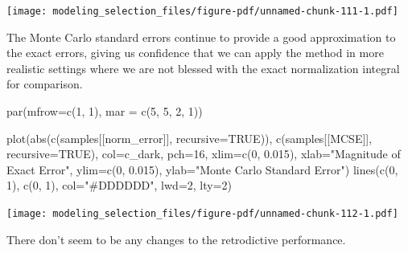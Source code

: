 \documentclass[
  letterpaper,
  DIV=11,
  numbers=noendperiod]{scrartcl}
\newenvironment{Shaded}{\begin{snugshade}}{\end{snugshade}}
\newcommand{\AttributeTok}[1]{\textcolor[rgb]{0.40,0.45,0.13}{#1}}
\newcommand{\ConstantTok}[1]{\textcolor[rgb]{0.56,0.35,0.01}{#1}}
\newcommand{\DecValTok}[1]{\textcolor[rgb]{0.68,0.00,0.00}{#1}}
\newcommand{\FloatTok}[1]{\textcolor[rgb]{0.68,0.00,0.00}{#1}}
\newcommand{\FunctionTok}[1]{\textcolor[rgb]{0.28,0.35,0.67}{#1}}
\newcommand{\NormalTok}[1]{\textcolor[rgb]{0.00,0.23,0.31}{#1}}
\newcommand{\StringTok}[1]{\textcolor[rgb]{0.13,0.47,0.30}{#1}}
\begin{document}
\texttt{[image: modeling\_selection\_files/figure-pdf/unnamed-chunk-111-1.pdf]}

The Monte Carlo standard errors continue to provide a good approximation
to the exact errors, giving us confidence that we can apply the method
in more realistic settings where we are not blessed with the exact
normalization integral for comparison.

\begin{Shaded}
\begin{Highlighting}[]
\FunctionTok{par}\NormalTok{(}\AttributeTok{mfrow=}\FunctionTok{c}\NormalTok{(}\DecValTok{1}\NormalTok{, }\DecValTok{1}\NormalTok{), }\AttributeTok{mar =} \FunctionTok{c}\NormalTok{(}\DecValTok{5}\NormalTok{, }\DecValTok{5}\NormalTok{, }\DecValTok{2}\NormalTok{, }\DecValTok{1}\NormalTok{))}

\FunctionTok{plot}\NormalTok{(}\FunctionTok{abs}\NormalTok{(}\FunctionTok{c}\NormalTok{(samples[[}\StringTok{\textquotesingle{}norm\_error\textquotesingle{}}\NormalTok{]], }\AttributeTok{recursive=}\ConstantTok{TRUE}\NormalTok{)),}
         \FunctionTok{c}\NormalTok{(samples[[}\StringTok{\textquotesingle{}MCSE\textquotesingle{}}\NormalTok{]], }\AttributeTok{recursive=}\ConstantTok{TRUE}\NormalTok{),}
     \AttributeTok{col=}\NormalTok{c\_dark, }\AttributeTok{pch=}\DecValTok{16}\NormalTok{,}
     \AttributeTok{xlim=}\FunctionTok{c}\NormalTok{(}\DecValTok{0}\NormalTok{, }\FloatTok{0.015}\NormalTok{), }\AttributeTok{xlab=}\StringTok{"Magnitude of Exact Error"}\NormalTok{,}
     \AttributeTok{ylim=}\FunctionTok{c}\NormalTok{(}\DecValTok{0}\NormalTok{, }\FloatTok{0.015}\NormalTok{), }\AttributeTok{ylab=}\StringTok{"Monte Carlo Standard Error"}\NormalTok{)}
\FunctionTok{lines}\NormalTok{(}\FunctionTok{c}\NormalTok{(}\DecValTok{0}\NormalTok{, }\DecValTok{1}\NormalTok{), }\FunctionTok{c}\NormalTok{(}\DecValTok{0}\NormalTok{, }\DecValTok{1}\NormalTok{), }\AttributeTok{col=}\StringTok{"\#DDDDDD"}\NormalTok{, }\AttributeTok{lwd=}\DecValTok{2}\NormalTok{, }\AttributeTok{lty=}\DecValTok{2}\NormalTok{)}
\end{Highlighting}
\end{Shaded}

\texttt{[image: modeling\_selection\_files/figure-pdf/unnamed-chunk-112-1.pdf]}

There don't seem to be any changes to the retrodictive performance.
\end{document}
